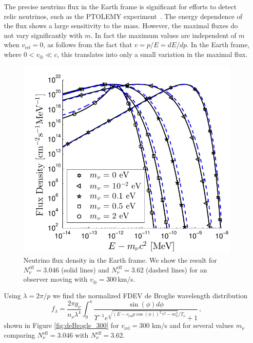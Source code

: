 The precise neutrino flux in the Earth frame is significant for efforts to detect relic neutrinos, such as the PTOLEMY experiment~\cite{Betts:2013uya}. The energy dependence of the flux shows a large sensitivity to the mass. However, the maximal fluxes do not vary significantly with $m$. In fact the maximum values are independent of $m$ when $v_{\text{rel}}=0$, as follows from the fact that $v=p/E=dE/dp$.  In the Earth frame, where $0<v_\oplus\ll c$, this translates into only a small variation in the maximal flux.

\begin{figure}
\centerline{\includegraphics[width=0.9\linewidth]{04-birrell/NeutrinoDistributionToday/Figures/flux_dist.pdf}}
\caption{Neutrino flux density in the Earth frame. We show the result for $N_\nu^{\mathrm{eff}}=3.046$ (solid lines) and $N_\nu^{\mathrm{eff}}=3.62$ (dashed lines) for an observer moving with $v_\oplus=300$\,km/s. }
\label{fig:flux_dist}
 \end{figure}

Using $\lambda=2\pi/p$ we find  the normalized FDEV de Broglie wavelength distribution
\begin{equation}
f_\lambda=\frac{ 2\pi g_\nu}{n_\nu\lambda^4}\!\!\int_0^\pi\!\!\! \!\frac{\sin(\phi) d\phi}{\Upsilon^{-1}e^{\sqrt{( E-v_{\text{rel}} p \cos(\phi))^2\gamma^2-m_\nu^2}/T_\nu}\!\!+\!1}\,,
\end{equation}
shown in Figure \ref{fig:deBrogle_300} for $v_{\text{rel}}=300$ km/s and for several values $m_\nu$ comparing  $N_\nu^{\mathrm{eff}}=3.046$ with $N_\nu^{\mathrm{eff}}=3.62$. %

